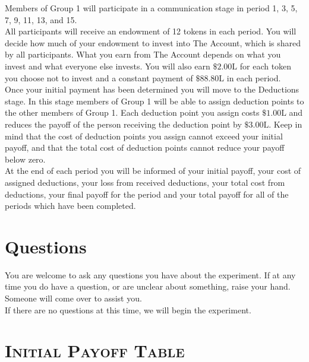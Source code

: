 \documentclass[12pt]{article}
\begin{document}
Members of Group 1 will participate in a communication stage in period 1, 3, 5, 7, 9, 11, 13, and 15.\\

All participants will receive an endowment of 12 tokens in each period. You will decide how much of your endowment to invest into The Account, which is shared by all participants. What you earn from The Account depends on what you invest and what everyone else invests. You will also earn $\$2.00\text{L}$ for each 
token you choose not to invest and a constant payment of $\$88.80\text{L}$ in each period.\\

Once your initial payment has been determined you will move to the Deductions stage. In this stage members of Group 1 will be able to assign deduction points to the other members of Group 1. Each deduction point you assign costs $\$1.00\text{L}$ and reduces the payoff of the person receiving the deduction point by $\$3.00\text{L}$. Keep in mind that the cost of deduction points you assign cannot exceed your initial payoff, and that the total cost of deduction points cannot reduce your payoff below zero.\\

At the end of each period you will be informed of your initial payoff, your cost of assigned deductions, your loss from received deductions, your total cost from deductions, your final payoff for the period and your total payoff for all of the periods which have been completed.

\section*{Questions}


You are welcome to ask any questions you have about the experiment.  If at any time you do have a question, or are unclear about something, raise your hand. Someone will come over to assist you.\\

If there are no questions at this time, we will begin the experiment.\\


\newpage

\section*{\bf \scshape Initial Payoff Table}
\end{document}
